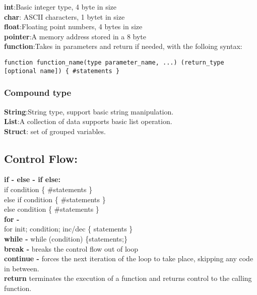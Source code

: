 \documentclass[11pt]{article}
\begin{document}
\begin{adjustwidth}{1cm}{}
\textbf{int}:Basic integer type, 4 byte in size \\
\textbf{char}: ASCII characters, 1 bytet in size\\
\textbf{float}:Floating point numbers, 4 bytes in size\\
\textbf{pointer}:A memory address stored in a 8 byte\\
\textbf{function}:Takes in parameters and return if needed, with the folloing syntax:
\begin{lstlisting}
function function_name(type parameter_name, ...) (return_type [optional name]) { #statements }
\end{lstlisting}
\end{adjustwidth}

\subsubsection{Compound type}

\begin{adjustwidth}{1cm}{}
\textbf{String}:String type, support basic string manipulation.\\
\textbf{List}:A collection of data supports basic list operation.\\
\textbf{Struct}: set of grouped variables.\\
\end{adjustwidth}
\subsection{Control Flow:}
\begin{adjustwidth}{1cm}{}
\textbf {if - else - if else: } \\
\indent if condition \{ \#statements \}\\
\indent else if condition \{ \#statements \}\\
\indent else condition \{ \#statements \}\\
 \textbf{for -} \\ \indent for init; condition; inc/dec \{ statements \} \\
\textbf{while -} while (condition) \{statements;\}\\
\textbf{break -} breaks the control flow out of loop \\
\textbf{continue -} forces the next iteration of the loop to take place, skipping any code in between. \\
\textbf{return} terminates the execution of a function and returns control to the calling function.
\end{adjustwidth}
\end{document}
